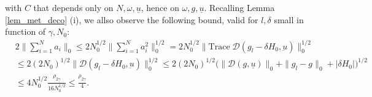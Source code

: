 \documentclass[reqno,twoside,11pt]{amsart}
\numberwithin{equation}{section}
\theoremstyle{plain}
\theoremstyle{definition}
\begin{document}
with $C$ that depends only on $N,\omega, \underline u$, hence on $\omega, g, \underline u$.
Recalling Lemma \ref{lem_met_deco} (i), we allso observe the
following bound, valid for $l, \delta$ small in function of $\gamma, N_0$:
\begin{equation}\label{b1}
\begin{split}
& 2\|\sum_{i=1}^N a_i\|_0\leq 2N_0^{1/2}\big\|\sum_{i=1}^Na_i^2\big\|_0^{1/2}=
2N_0^{1/2}\big\|\mbox{Trace}\;\mathcal{D}(g_l-\delta H_0,\underbar u) \big\|_0^{1/2}
\\ & \leq 2(2N_0)^{1/2}\|\mathcal{D}(g_l-\delta H_0,\underbar u)\|_0^{1/2}
\leq 2(2N_0)^{1/2}\big(\|\mathcal{D}(g,\underline u)\|_0+\|g_l-g\|_0 +
|\delta H_0|\big)^{1/2}\\ & \leq 4 N_0^{1/2}
\frac{\rho_{2\underline\gamma}}{16N_0^{1/2}}\leq \frac{\rho_{2\underline\gamma}}{4}.
\end{split}
\end{equation}

\smallskip
\end{document}
